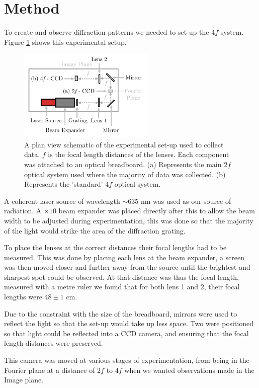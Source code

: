 \documentclass[twocolumn]{revtex4}
\begin{document}
\section{Method} 
\vspace{-2ex}
To create and observe diffraction patterns we needed to set-up the $4f$ system. Figure \ref{m-fig1} shows this experimental setup.
\begin{figure}[!h]
\begin{center}
\includegraphics[width=6.5cm]{method/fig1-1}
\caption[]{A plan view schematic of the experimental set-up used to collect data. $f$ is the focal length distances of the lenses. Each component was attached to an optical breadboard. (a) Represents the main $2f$ optical system used where the majority of data was collected. (b) Represents the 'standard' $4f$ optical system.}
\label{m-fig1}
\end{center}
\end{figure}

A coherent laser source of wavelength $\sim635$ nm was used as our source of radiation. A $\times10$ beam expander was placed directly after this to allow the beam width to be adjusted during experimentation, this was done so that the majority of the light would strike the area of the diffraction grating.

To place the lenses at the correct distances their focal lengths had to be measured. This was done by placing each lens at the beam expander, a screen was then moved closer and further away from the source until the brightest and sharpest spot could be observed. At that distance was thus the focal length, measured with a metre ruler we found that for both lens 1 and 2, their focal lengths were $48\pm1$ cm.

Due to the constraint with the size of the breadboard, mirrors were used to reflect the light so that the set-up would take up less space. Two were positioned so that light could be reflected into a CCD camera, and ensuring that the focal length distances were preserved.

This camera was moved at various stages of experimentation, from being in the Fourier plane at a distance of $2f$ to $4f$ when we wanted observations made in the Image plane.
\end{document}
